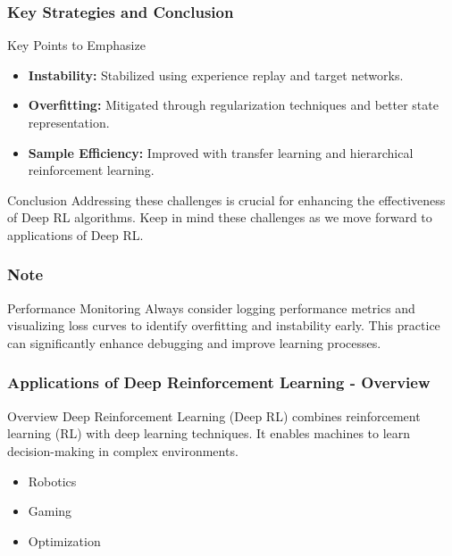\documentclass[aspectratio=169]{beamer}
\begin{document}
\begin{frame}[fragile]
  \frametitle{Key Strategies and Conclusion}
  \begin{block}{Key Points to Emphasize}
    \begin{itemize}
      \item \textbf{Instability:} Stabilized using experience replay and target networks.
      \item \textbf{Overfitting:} Mitigated through regularization techniques and better state representation.
      \item \textbf{Sample Efficiency:} Improved with transfer learning and hierarchical reinforcement learning.
    \end{itemize}
  \end{block}
  \begin{block}{Conclusion}
    Addressing these challenges is crucial for enhancing the effectiveness of Deep RL algorithms. Keep in mind these challenges as we move forward to applications of Deep RL.
  \end{block}
\end{frame}

\begin{frame}[fragile]
  \frametitle{Note}
  \begin{block}{Performance Monitoring}
    Always consider logging performance metrics and visualizing loss curves to identify overfitting and instability early. This practice can significantly enhance debugging and improve learning processes.
  \end{block}
\end{frame}

\begin{frame}[fragile]
  \frametitle{Applications of Deep Reinforcement Learning - Overview}
  \begin{block}{Overview}
    Deep Reinforcement Learning (Deep RL) combines reinforcement learning (RL) with deep learning techniques. It enables machines to learn decision-making in complex environments.
  \end{block}
  \begin{itemize}
    \item Robotics
    \item Gaming
    \item Optimization
  \end{itemize}
\end{frame}
\end{document}
